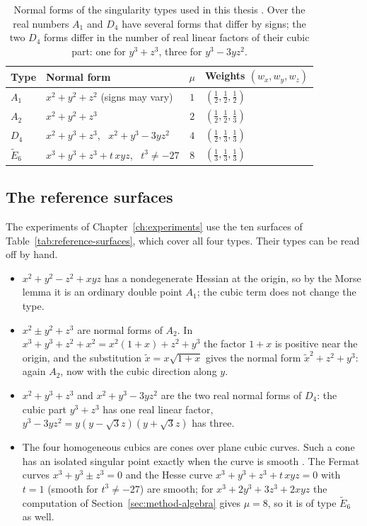 \begin{table}[!h]
\centering
\small
\begin{tabular}{l l c l}
\toprule
Type & Normal form & $\mu$ & Weights $(w_x,w_y,w_z)$ \\
\midrule
$A_1$ & $x^2+y^2+z^2$ (signs may vary) & $1$ & $(\frac12,\frac12,\frac12)$ \\
$A_2$ & $x^2+y^2+z^3$ & $2$ & $(\frac12,\frac12,\frac13)$ \\
$D_4$ & $x^2+y^3+z^3$, \ $x^2+y^3-3yz^2$ & $4$ & $(\frac12,\frac13,\frac13)$ \\
$\tilde E_6$ & $x^3+y^3+z^3+t\,xyz$, \ $t^3\neq-27$ & $8$ & $(\frac13,\frac13,\frac13)$ \\
\bottomrule
\end{tabular}
\caption[Normal forms]{Normal forms of the singularity types used in this
thesis \cite{arnold2012singularities}. Over the real numbers $A_1$ and $D_4$
have several forms that differ by signs; the two $D_4$ forms differ in the
number of real linear factors of their cubic part: one for $y^3+z^3$, three
for $y^3-3yz^2$.}
\label{tab:normal-forms}
\end{table}

\subsection{The reference surfaces}
\label{sec:reference-surfaces}

The experiments of Chapter~\ref{ch:experiments} use the ten surfaces of
Table~\ref{tab:reference-surfaces}, which cover all four types. Their types
can be read off by hand.
\begin{itemize}
    \item $x^2+y^2-z^2+xyz$ has a nondegenerate Hessian at the origin, so by the
          Morse lemma \cite{milnor1963morse} it is an ordinary double point
          $A_1$; the cubic term does not change the type.
    \item $x^2\pm y^2+z^3$ are normal forms of $A_2$. In
          $x^3+y^3+z^2+x^2=x^2(1+x)+z^2+y^3$ the factor $1+x$ is positive near
          the origin, and the substitution $\tilde x=x\sqrt{1+x}$ gives the
          normal form $\tilde x^2+z^2+y^3$: again $A_2$, now with the cubic
          direction along $y$.
    \item $x^2+y^3+z^3$ and $x^2+y^3-3yz^2$ are the two real normal forms of
          $D_4$: the cubic part $y^3+z^3$ has one real linear factor,
          $y^3-3yz^2=y(y-\sqrt3z)(y+\sqrt3z)$ has three.
    \item The four homogeneous cubics are cones over plane cubic curves. Such a
          cone has an isolated singular point exactly when the curve is smooth
          \cite{dimca1992singularities}. The Fermat curves $x^3+y^3\pm z^3=0$
          and the Hesse curve $x^3+y^3+z^3+t\,xyz=0$ with $t=1$ (smooth for
          $t^3\neq-27$) are smooth; for $x^3+2y^3+3z^3+2xyz$ the computation of
          Section~\ref{sec:method-algebra} gives $\mu=8$, so it is of type
          $\tilde E_6$ as well.
\end{itemize}

